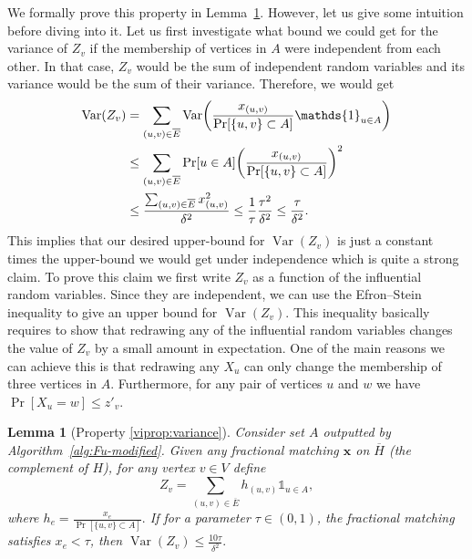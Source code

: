 \documentclass[letterpaper,11pt]{article}
\makeatletter
\DeclareMathOperator{\var}{Var}
\let\originalleft\left
\let\originalright\right
\renewcommand{\left}{\mathopen{}\mathclose\bgroup\originalleft}
\renewcommand{\right}{\aftergroup\egroup\originalright}
\newtheorem{lemma}{Lemma}[section]
\renewcommand{\paragraph}{\@startsection{paragraph}{4}{\z@}{10pt}{-1em}{\normalfont\normalsize\bfseries}}
\makeatother
\begin{document}
\paragraph{Proof of Property \ref{viprop:variance}.} We formally prove this property in Lemma~\ref{lem:BoundedVarZv}. However, let us give some intuition before diving into it. Let us first investigate what bound we could get for the variance of $Z_v$ if the membership of vertices in $A$ were independent from each other. In that case,  $Z_v$ would be the sum of independent random variables and its variance would  be  the sum of their variance. Therefore, we would get
\begin{align*}
    \var(Z_v) &= \sum_{(u,v)\in \overline{E}}\var\left (\frac{x_{(u,v)}}{\Pr[\{u,v\}\subset A]}\mathds{1}_{u\in A}\right) \\ & \leq \sum_{(u,v)\in \overline{E}} \Pr[u\in A] \left( \frac{x_{(u,v)}}{\Pr[\{u,v\}\subset A]} \right)^2 \\ &  \leq 
    \frac{\sum_{(u,v)\in \overline{E}}x_{(u,v)}^2}{\delta^2}
      \leq 
    \frac{1}{\tau}\frac{\tau^2}{\delta^2} \leq \frac{\tau}{\delta^2}.
\end{align*}
This implies that our desired upper-bound for  $\var(Z_v)$ is just a constant times the upper-bound we would get under independence which is quite a strong claim. To prove this  claim  we first write $Z_v$ as a function of the influential random variables. Since they are independent, we can use the  Efron–Stein inequality to give an upper bound for $\var(Z_v)$. This inequality basically requires to show that redrawing any of the influential random variables changes the  value of $Z_v$ by a small amount in expectation. One of the main reasons we can achieve this  is that redrawing any  $X_u$ can only change the membership of three vertices in $A$. Furthermore, for any pair of vertices $u$ and $w$ we have $\Pr[X_u=w] \leq z'_v$.
 




\begin{lemma} [Property \ref{viprop:variance}]\label{lem:BoundedVarZv}
Consider set $A$ outputted by  Algorithm~\ref{alg:Fu-modified}. Given any fractional matching $\bm{x}$ on $\overline{H}$ (the complement of  $H$), for any vertex  $v\in V$ define  $$Z_v = \sum_{(u,v) \in  \overline{E}} h_{(u,v)}\mathds{1}_{u\in A},$$ where $h_{e}=\frac{x_e}{\Pr[\{u,v\}\subset A]}.$ If for a parameter $\tau\in (0,1)$, the fractional matching satisfies $x_e<\tau$, then $\var(Z_v)\leq \frac{10\tau}{\delta^2}.$
\end{lemma}
\end{document}
